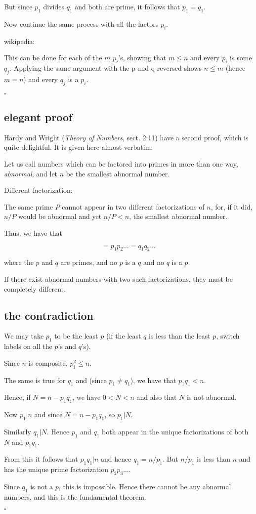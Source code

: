 \documentclass[11pt, oneside]{article}
\begin{document}
But since $p_1$ divides $q_1$ and both are prime, it follows that $p_1 = q_1$. 

Now continue the same process with all the factors $p_i$.

wikipedia:

    This can be done for each of the $m$ $p_i$'s, showing that $m \le n$ and every $p_i$ is some $q_j$. Applying the same argument with the p and q reversed shows $n \le m$ (hence $m = n$) and every $q_j$ is a $p_i$.
    
$\square$
    
\subsection*{elegant proof}

Hardy and Wright (\emph{Theory of Numbers}, sect. 2:11) have a second proof, which is quite delightful.  It is given here almost verbatim:

    Let us call numbers which can be factored into primes in more than one way, \emph{abnormal}, and let $n$ be the smallest abnormal number.

Different factorization:

The same prime $P$ cannot appear in two different factorizations of $n$, for, if it did, $n/P$ would be abnormal and yet $n/P < n$, the smallest abnormal number.

Thus, we have that

\[  = p_1 p_2 \dots = q_1 q_2 \dots \]
    
where the $p$ and $q$ are primes, and no $p$ is a $q$ and no $q$ is a $p$.

If there exist abnormal numbers with two such factorizations, they must be completely different.

\subsection*{the contradiction}

We may take $p_1$ to be the least $p$ (if the least $q$ is less than the least $p$, switch labels on all the $p$'s and $q$'s).  

Since $n$ is composite, $p_1^2 \le n$.

The same is true for $q_1$ and (since $p_1 \ne q_1$), we have that $p_1 q_1 < n$.

Hence, if $N = n - p_1 q_1$, we have $0 < N < n$ and also that $N$ is not abnormal.

Now $p_1 | n$ and since $N = n - p_1 q_1$, so $p_1 | N$.

Similarly $q_1 | N$.  Hence $p_1$ and $q_1$ both appear in the unique factorizations of both $N$ and $p_1 q_1$.

From this it follows that $p_1 q_1 | n$ and hence $q_1 = n/p_1$.  But $n/p_1$ is less than $n$ and has the unique prime factorization $p_2 p_3 \dots$.

Since $q_1$ is not a $p$, this is impossible.  Hence there cannot be any abnormal numbers, and this is the fundamental theorem.

$\square$
\end{document}
